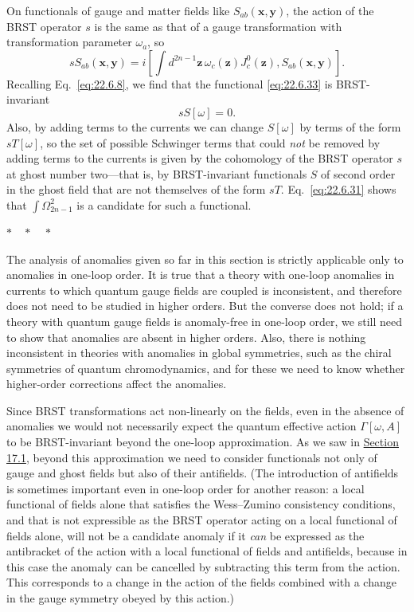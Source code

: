 On functionals of gauge and matter fields like
$S_{ab}(\mathbf x,\mathbf y)$, the action of the BRST operator $s$
is the same as that of a gauge transformation with transformation
parameter $\omega_a$, so
\[
 sS_{ab}(\mathbf x,\mathbf y)
 =i\left[
 \int d^{2n-1}\mathbf z\,\omega_c(\mathbf z)J^0_c(\mathbf z),
 S_{ab}(\mathbf x,\mathbf y)
 \right].
\]
Recalling Eq.~\eqref{eq:22.6.8}, we find that the functional
\eqref{eq:22.6.33} is BRST-invariant
\begin{equation}
 sS[\omega]=0.
 \tag{22.6.34}\label{eq:22.6.34}
\end{equation}
Also, by adding terms to the currents we can change $S[\omega]$ by terms
of the form $sT[\omega]$, so the set of possible Schwinger terms that
could \emph{not} be removed by adding terms to the currents is given by
the cohomology of the BRST operator $s$ at ghost number two---that is, by
BRST-invariant functionals $S$ of second order in the ghost field that are
not themselves of the form $sT$. Eq.~\eqref{eq:22.6.31} shows that
$\int\Omega^2_{2n-1}$ is a candidate for such a functional.

\begin{center}
$* \quad * \quad *$
\end{center}

The analysis of anomalies given so far in this section is strictly
applicable only to anomalies in one-loop order. It is true that a theory
with one-loop anomalies in currents to which quantum gauge fields are
coupled is inconsistent, and therefore does not need to be studied in
higher orders. But the converse does not hold; if a theory with quantum
gauge fields is anomaly-free in one-loop order, we still need to show that
anomalies are absent in higher orders. Also, there is nothing inconsistent
in theories with anomalies in global symmetries, such as the chiral
symmetries of quantum chromodynamics, and for these we need to know
whether higher-order corrections affect the anomalies.

Since BRST transformations act non-linearly on the fields, even in the
absence of anomalies we would not necessarily expect the quantum
effective action $\Gamma[\omega,A]$ to be BRST-invariant beyond the
one-loop approximation. As we saw in
\hyperref[sec:17.1]{Section 17.1}, beyond this approximation we need to
consider functionals not only of gauge and ghost fields but also of their
antifields. (The introduction of antifields is sometimes important even in
one-loop order for another reason: a local functional of fields alone that
satisfies the Wess--Zumino consistency conditions, and that is not
expressible as the BRST operator acting on a local functional of fields
alone, will not be a candidate anomaly if it \emph{can} be expressed as the
antibracket of the action with a local functional of fields and antifields,
because in this case the anomaly can be cancelled by subtracting this term
from the action. This corresponds to a change in the action of the fields
combined with a change in the gauge symmetry obeyed by this action.)

